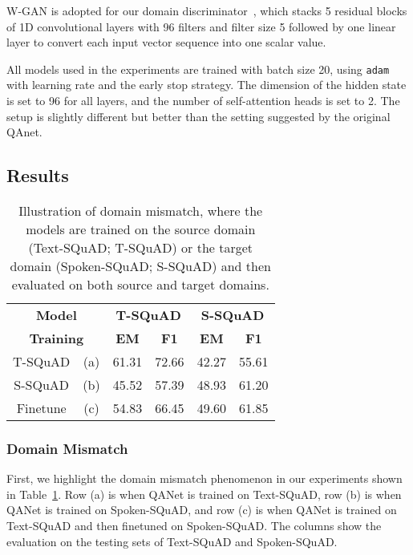 \documentclass{article}
\begin{document}
W-GAN is adopted for our domain discriminator~\cite{gulrajani2017improved}, which stacks 5 residual blocks of 1D convolutional layers with 96 filters and filter size 5 followed by one linear layer to convert each input vector sequence into one scalar value. 

All models used in the experiments are trained with batch size 20, using \texttt{adam} with learning rate  and the early stop strategy.
The dimension of the hidden state is set to 96 for all layers, and the number of self-attention heads is set to 2.
The setup is slightly different but better than the setting suggested by the original QAnet.


\subsection{Results}

\begin{table}[t!]
\centering
\caption{Illustration of domain mismatch, where the models are trained on the source domain (Text-SQuAD; T-SQuAD) or the target domain (Spoken-SQuAD; S-SQuAD) and then evaluated on both source and target domains.}
\label{tab:domain}
\vspace{2mm}
\begin{tabular}{|c|c|c|c|c|c|}
\hline
\multicolumn{2}{|c|}{\bf Model}  &
\multicolumn{2}{|c|}{\bf T-SQuAD} &
\multicolumn{2}{|c|}{\bf S-SQuAD} \\
\cline{3-6}
\multicolumn{2}{|c|}{\bf Training} &\textbf{EM} & \textbf{F1} &\textbf{EM} & \textbf{F1} \\
\hline
\hline
T-SQuAD & (a) & 61.31 & 72.66 & 42.27 & 55.61 \\
S-SQuAD  & (b) & 45.52 & 57.39 & 48.93 & 61.20\\
\hline
Finetune & (c) & 54.83 & 66.45 & 49.60 & 61.85 \\
\hline
\end{tabular}
\end{table}


\subsubsection{Domain Mismatch}
First, we highlight the domain mismatch phenomenon in our experiments shown in Table~\ref{tab:domain}.
Row (a) is when QANet is trained on Text-SQuAD, row (b) is when QANet is trained on Spoken-SQuAD, and row (c) is when QANet is trained on Text-SQuAD and then finetuned on Spoken-SQuAD. 
The columns show the evaluation on the testing sets of Text-SQuAD and Spoken-SQuAD. 
\end{document}
